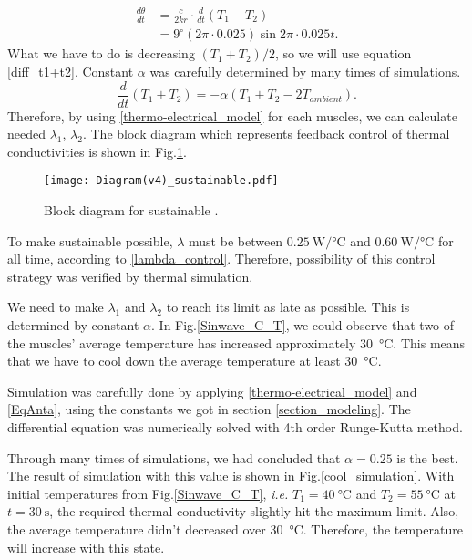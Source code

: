 \begin{equation} \label{theta_diff}
\begin{aligned} 
\frac{d\theta}{dt} & = \frac{c}{2kr}\cdot\frac{d}{dt}(T_{1}-T_{2}) \\
& = 9^{\circ}(2\pi\cdot 0.025)\sin{2\pi\cdot 0.025t}.
\end{aligned}
\end{equation}
What we have to do is decreasing $(T_{1}+T_{2})/2$, so we will use equation \eqref{diff_t1+t2}. Constant $\alpha$ was carefully determined by many times of simulations.
\begin{equation} \label{diff_t1+t2}
\frac{d}{dt}(T_{1}+T_{2}) = -\alpha(T_{1}+T_{2}-2T_{ambient}).
\end{equation}
Therefore, by using \eqref{thermo-electrical_model} for each muscles, we can calculate needed $\lambda_{1}$, $\lambda_{2}$. The block diagram which represents feedback control of thermal conductivities is shown in Fig.\ref{diagram_sustainable}.

\begin{figure}[t]
	\centering\texttt{[image: Diagram(v4)\_sustainable.pdf]}
	\caption{Block diagram for sustainable \apcnospace.}
	\label{diagram_sustainable}
\end{figure}

To make sustainable \apc possible, $\lambda$ must be between $\SI{0.25}{\watt\per\degreeCelsius}$ and $\SI{0.60}{\watt\per\degreeCelsius}$ for all time, according to \eqref{lambda_control}. Therefore, possibility of this control strategy was verified by thermal simulation.

We need to make $\lambda_{1}$ and $\lambda_{2}$ to reach its limit as late as possible. This is determined by constant $\alpha$. 
In Fig.\ref{Sinwave_C_T}, we could observe that two of the muscles' average temperature has increased approximately \SI{30}{\degreeCelsius}. This means that we have to cool down the average temperature at least \SI{30}{\degreeCelsius}. 

Simulation was carefully done by applying \eqref{thermo-electrical_model} and \eqref{EqAnta}, using the constants we got in section \ref{section_modeling}. The differential equation was numerically solved with 4th order Runge-Kutta method. 

Through many times of simulations, we had concluded that $\alpha = 0.25$ is the best. The result of simulation with this value is shown in Fig.\ref{cool_simulation}. With initial temperatures from Fig.\ref{Sinwave_C_T}, {\it i.e.} $T_{1}=\SI{40}{\degreeCelsius}$ and $T_{2}=\SI{55}{\degreeCelsius}$ at $t=\SI{30}{\second}$, the required thermal conductivity slightly hit the maximum limit. Also, the average temperature didn't decreased over \SI{30}{\degreeCelsius}. Therefore, the temperature will increase with this state.

